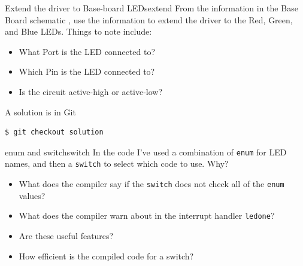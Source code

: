 \documentclass[a4paper]{tufte-handout}
\begin{document}
\begin{exercise}{Extend the driver to Base-board LEDs}{extend}
From the information in the Base Board schematic \citep{baseboard},
use the information to extend the driver to the Red, Green, and Blue
LEDs.  Things to note include:
\begin{itemize}
\item What Port is the LED connected to?
\item Which Pin is the LED connected to?
\item Is the circuit active-high or active-low?
\end{itemize}
\begin{tcolorbox}[colframe=red!50!black,title=Solution]
A solution is in Git 
\begin{verbatim}
$ git checkout solution
\end{verbatim}
\end{tcolorbox}
\end{exercise}

\begin{question}{enum and switch}{switch}
In the code I've used a combination of \texttt{enum} for LED names,
and then a \texttt{switch} to select which code to use.  Why?
\begin{itemize}
\item What does the compiler say if the \texttt{switch} does not check
  all of the \texttt{enum} values?
\item What does the compiler warn about in the interrupt handler
  \texttt{ledone}?
\item Are these useful features?
\item How efficient is the compiled code for a switch?
\end{itemize}
\end{question}






\appendix
\end{document}
